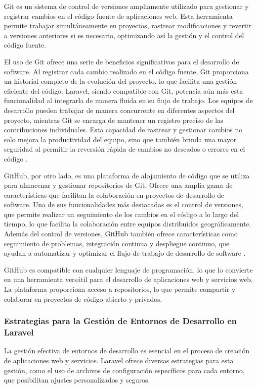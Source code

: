 Git es un sistema de control de versiones ampliamente utilizado para gestionar y registrar cambios en el código fuente de aplicaciones web. Esta herramienta permite trabajar simultáneamente en proyectos, rastrear modificaciones y revertir a versiones anteriores si es necesario, optimizando así la gestión y el control del código fuente.

El uso de Git ofrece una serie de beneficios significativos para el desarrollo de software. Al registrar cada cambio realizado en el código fuente, Git proporciona un historial completo de la evolución del proyecto, lo que facilita una gestión eficiente del código. Laravel, siendo compatible con Git, potencia aún más esta funcionalidad al integrarla de manera fluida en su flujo de trabajo. Los equipos de desarrollo pueden trabajar de manera concurrente en diferentes aspectos del proyecto, mientras Git se encarga de mantener un registro preciso de las contribuciones individuales. Esta capacidad de rastrear y gestionar cambios no solo mejora la productividad del equipo, sino que también brinda una mayor seguridad al permitir la reversión rápida de cambios no deseados o errores en el código \cite{git}.

GitHub, por otro lado, es una plataforma de alojamiento de código que se utiliza para almacenar y gestionar repositorios de Git. Ofrece una amplia gama de características que facilitan la colaboración en proyectos de desarrollo de software. Una de sus funcionalidades más destacadas es el control de versiones, que permite realizar un seguimiento de los cambios en el código a lo largo del tiempo, lo que facilita la colaboración entre equipos distribuidos geográficamente. Además del control de versiones, GitHub también ofrece características como seguimiento de problemas, integración continua y despliegue continuo, que ayudan a automatizar y optimizar el flujo de trabajo de desarrollo de software \cite{github}.

GitHub es compatible con cualquier lenguaje de programación, lo que lo convierte en una herramienta versátil para el desarrollo de aplicaciones web y servicios web. La plataforma proporciona acceso a repositorios, lo que permite compartir y colaborar en proyectos de código abierto y privados.


\subsubsection{Estrategias para la Gestión de Entornos de Desarrollo en Laravel}
La gestión efectiva de entornos de desarrollo es esencial en el proceso de creación de aplicaciones web y servicios. Laravel ofrece diversas estrategias para esta gestión, como el uso de archivos de configuración específicos para cada entorno, que posibilitan ajustes personalizados y seguros.

